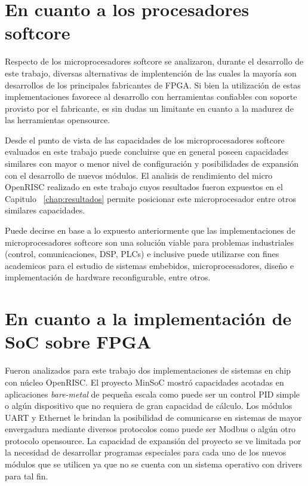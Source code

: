 	\section{En cuanto a los procesadores softcore} 
	
Respecto de los microprocesadores softcore se analizaron, durante el desarrollo de este trabajo, diversas alternativas de implentención de las cuales
la mayoría son desarrollos de los principales fabricantes de FPGA. Si bien la utilización de estas implementaciones favorece al desarrollo con
herramientas confiables con soporte provisto por el fabricante, es sin dudas un limitante en cuanto a la madurez de las herramientas opensource.

Desde el punto de vista de las capacidades de los microprocesadores softcore evaluados en este trabajo puede concluirse que en general poseen
capacidades similares con mayor o menor nivel de configuración y posibilidades de expansión con el desarrollo de nuevos módulos. El analisis de
rendimiento del micro OpenRISC realizado en este trabajo cuyos resultados fueron expuestos en el Capitulo ~\ref {chap:resultados} permite posicionar
este microprocesador entre otros similares capacidades.

Puede decirse en base a lo expuesto anteriormente que las implementaciones de microprocesadores softcore son una solución viable para problemas
industriales (control, comunicaciones, DSP, PLCs) e inclusive puede utilizarse con fines academicos para el estudio de sistemas embebidos,
microprocesadores, diseño e implementación de hardware reconfigurable, entre otros.

	\section{En cuanto a la implementación de SoC sobre FPGA} 

Fueron analizados para este trabajo dos implementaciones de sistemas en chip con núcleo OpenRISC. El proyecto MinSoC mostró capacidades acotadas en
aplicaciones \textit{bare-metal} de pequeña escala como puede ser un control PID simple o algún dispositivo que no requiera de gran capacidad de
cálculo. Los módulos UART y Ethernet le brindan la posibilidad de comunicarse en sistemas de mayor envergadura mediante diversos protocolos como
puede ser Modbus o algún otro protocolo opensource. La capacidad de expansión del proyecto se ve limitada por la necesidad de desarrollar programas
especiales para cada uno de los nuevos módulos que se utilicen ya que no se cuenta con un sistema operativo con drivers para tal fin.

